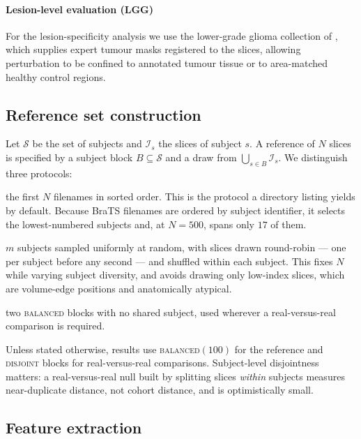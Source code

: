 \documentclass[preprint,12pt,authoryear]{elsarticle}
\begin{document}
\paragraph{Lesion-level evaluation (LGG)}
For the lesion-specificity analysis we use the lower-grade glioma collection of
\citet{buda2019association}, which supplies expert tumour masks registered to
the slices, allowing perturbation to be confined to annotated tumour tissue or
to area-matched healthy control regions.

\subsection{Reference set construction}
\label{sec:refproto}

Let $\mathcal{S}$ be the set of subjects and $\mathcal{I}_s$ the slices of
subject $s$. A reference of $N$ slices is specified by a subject block
$B \subseteq \mathcal{S}$ and a draw from $\bigcup_{s \in B}\mathcal{I}_s$. We
distinguish three protocols:

\begin{description}[leftmargin=*, topsep=2pt, itemsep=2pt]
\item[\textsc{head}] the first $N$ filenames in sorted order. This is the
      protocol a directory listing yields by default. Because BraTS filenames
      are ordered by subject identifier, it selects the lowest-numbered
      subjects and, at $N=500$, spans only $17$ of them.
\item[\textsc{balanced}$(m)$] $m$ subjects sampled uniformly at random, with
      slices drawn round-robin --- one per subject before any second --- and
      shuffled within each subject. This fixes $N$ while varying subject
      diversity, and avoids drawing only low-index slices, which are
      volume-edge positions and anatomically atypical.
\item[\textsc{disjoint}] two \textsc{balanced} blocks with no shared subject,
      used wherever a real-versus-real comparison is required.
\end{description}

Unless stated otherwise, results use \textsc{balanced}$(100)$ for the reference
and \textsc{disjoint} blocks for real-versus-real comparisons. Subject-level
disjointness matters: a real-versus-real null built by splitting slices
\emph{within} subjects measures near-duplicate distance, not cohort distance,
and is optimistically small.

\subsection{Feature extraction}
\label{sec:features}
\end{document}
